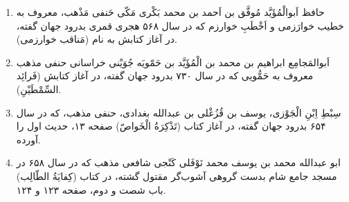 \begin{enumerate}
\item

حافظ اَبوالْمُؤَیَّد مُوفَّق بن اَحمد بن محمد بَکْری مَکّی حَنفی مَذْهب، معروف به خطیب
خوارَزمی و اَخْطَبِ خوارزم که در سال ۵۶۸ هجری قمری بدرود جهان گفته، در آغاز
کتابش به نام (مَناقب خوارزمی).

\item

اَبوالمَجامِع ابراهیم بن محمد بن الْمُؤَیَّد بن حَمّویَه جُوَیْنی خراسانی حنفی مذهب
معروف به حَمُّویی که در سال ۷۳۰ بدرود جهان گفته، در آغاز کتابش (فَرائِد
السِّمْطَیْنِ).

\item

 سِبْطِ اِبْنِ‌ الْجَوْزی‌‌، یوسف‌ بن‌ قُزُغْلى‌ بن عبدالله بغدادی، حنفی مذهب، که در سال
 ۶۵۴ بدرود جهان گفته، در آغاز کتاب (تَذْکِرَةُ الْخَواصّ) صفحه ۱۳، حدیث اول را
 آورده.

\item
  
ابو عبدالله محمد بن یوسف محمد نَوْفَلی كَنْجی شافعی مذهب كه در سال ۶۵۸ در
مسجد جامع شام بدست گروهی آشوب‌گر مقتول گشته، در كتاب (كِفایَةُ الطّالِب) باب
شصت و دوم، صفحه ۱۲۳ و ۱۲۴.

\end{enumerate}
  
